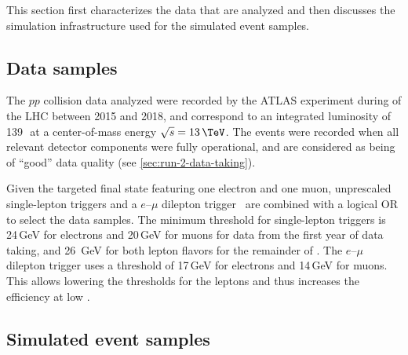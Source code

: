 %


\newcommand{\quotebox}[1]{
\begin{mdframed}[backgroundcolor=blue!8!gray!8,rightline=false,leftline=false,topline=false,bottomline=false]
{\LARGE``}{#1}{{\LARGE''}}~\cite{HWWPaper}
\end{mdframed}
}

This section first characterizes the data that are analyzed and then discusses the simulation infrastructure used for the simulated event samples.

\subsection{Data samples}
\label{subsec:data-samples}
The $pp$ collision data analyzed were recorded by the ATLAS experiment during \RunTwo of the LHC between 2015 and 2018, and correspond to an integrated luminosity of 139\,\ifb\ at a center-of-mass energy $\sqrt{s} = 13\,\TeV$.
The events were recorded when all relevant detector components were fully operational, and are considered as being of ``good'' data quality (see \cref{sec:run-2-data-taking}).

Given the targeted final state featuring one electron and one muon, unprescaled single-lepton triggers and a $e$--$\mu$ dilepton trigger~\cite{TRIG-2018-05,TRIG-2018-01} are combined with a logical OR to select the data samples. 
The minimum \pT threshold for single-lepton triggers is 24\,GeV for electrons and 20\,GeV for muons for data from the first year of data taking, and 26~GeV for both lepton flavors for the remainder of \RunTwo.
The $e$--$\mu$ dilepton trigger uses a \pT threshold of 17\,GeV for electrons and 14\,GeV for muons. This allows lowering the \pT thresholds for the leptons and thus increases the efficiency at low \pT.

\subsection{Simulated event samples}
\label{subsec:simulated-event-samples}

